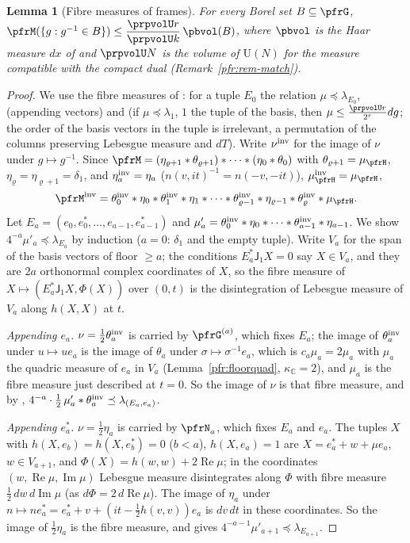 \documentclass[10pt]{amsart}
\newtheorem{lemma}[theorem]{Lemma}
\theoremstyle{definition}
\theoremstyle{remark}
\newcommand{\C}{\mathbb C}
\newcommand{\Rel}{\operatorname{Re}}
\newcommand{\Iml}{\operatorname{Im}}
\providecommand{\auU}{\mathrm U}
\begin{document}
\begin{lemma}[Fibre measures of frames]\label{prp:fibre}
For every Borel set $B\subseteq\pfrG$, $\pfrM(\{g:g^{-1}\in B\})\le\dfrac{\prpvolU r}{\prpvolU k}\,\pbvol(B)$,
where $\pbvol$ is the Haar measure $dx$ of {\cite[\S3.2.1]{P51}} and $\prpvolU N$ is the volume of
$\auU(N)$ for the measure compatible with the compact dual \textup{(}Remark~\ref{pfr:rem-match}\textup{)}.
\end{lemma}
\begin{proof}
We use the fibre measures of {\cite[\S8.4.4]{P51}}: for a tuple $E_0$ the relation $\mu\preceq\lambda_{E_0}$,
{\cite[Lemma~8.81(a)]{P51}} (appending vectors) and {\cite[Lemma~8.80]{P51}} (if $\mu\preceq\lambda_1$, $1$ the tuple of
the basis, then $\mu\le\frac{\prpvolU r}{2^r}dg$; the order of the basis vectors in the tuple is irrelevant, a
permutation of the columns preserving Lebesgue measure and $dT$). Write $\nu^{\rm inv}$ for the image of $\nu$
under $g\mapsto g^{-1}$. Since $\pfrM=(\eta_{\varrho+1}*\theta_{\varrho+1})*\dots*(\eta_0*\theta_0)$ with
$\theta_{\varrho+1}=\mu_\pfrH$, $\eta_\varrho=\eta_{\varrho+1}=\delta_1$, and $\eta_a^{\rm inv}=\eta_a$
($n(v,it)^{-1}=n(-v,-it)$), $\mu_\pfrH^{\rm inv}=\mu_\pfrH$,
\[
\pfrM^{\rm inv}=\theta_0^{\rm inv}*\eta_0*\theta_1^{\rm inv}*\eta_1*\dots*\theta_{\varrho-1}^{\rm inv}*\eta_{\varrho-1}*
\theta_\varrho^{\rm inv}*\mu_\pfrH .
\]
Let $E_a=(e_0,e_0^*,\dots,e_{a-1},e_{a-1}^*)$ and $\mu'_a=\theta_0^{\rm inv}*\eta_0*\dots*\theta_{a-1}^{\rm inv}*\eta_{a-1}$.
We show $4^{-a}\mu'_a\preceq\lambda_{E_a}$ by induction ($a=0$: $\delta_1$ and the empty tuple). Write $V_a$ for the
span of the basis vectors of floor $\ge a$; the conditions $E_a^*\mathsf J_1X=0$ say $X\in V_a$, and they are $2a$
orthonormal complex coordinates of $X$, so the fibre measure of $X\mapsto(E_a^*\mathsf J_1X,\Phi(X))$ over
$(0,t)$ is the disintegration of Lebesgue measure of $V_a$ along $h(X,X)$ at $t$.

\emph{Appending $e_a$.} $\nu=\frac12\theta_a^{\rm inv}$ is carried by $\pfrG^{(a)}$, which fixes $E_a$; the image of
$\theta_a^{\rm inv}$ under $u\mapsto ue_a$ is the image of $\theta_a$ under $\sigma\mapsto\sigma^{-1}e_a$, which is
$c_a\mu_a=2\mu_a$ with $\mu_a$ the quadric measure of $e_a$ in $V_a$ (Lemma~\ref{pfr:floorquad}, $\kappa_\C=2$), and $\mu_a$
is the fibre measure just described at $t=0$. So the image of $\nu$ is that fibre measure, and by
{\cite[Lemma~8.81(a)]{P51}}, $4^{-a}\cdot\frac12\,\mu'_a*\theta_a^{\rm inv}\preceq\lambda_{(E_a,e_a)}$.

\emph{Appending $e_a^*$.} $\nu=\frac12\eta_a$ is carried by $\pfrN_a$, which fixes $E_a$ and $e_a$. The tuples $X$
with $h(X,e_b)=h(X,e_b^*)=0$ ($b<a$), $h(X,e_a)=1$ are $X=e_a^*+w+\mu e_a$, $w\in V_{a+1}$, and
$\Phi(X)=h(w,w)+2\Rel\mu$; in the coordinates $(w,\Rel\mu,\Iml\mu)$ Lebesgue measure disintegrates along $\Phi$ with
fibre measure $\frac12\,dw\,d\Iml\mu$ (as $d\Phi=2\,d\Rel\mu$). The image of $\eta_a$ under $n\mapsto ne_a^*=
e_a^*+v+(it-\frac12h(v,v))e_a$ is $dv\,dt$ in these coordinates. So the image of $\frac12\eta_a$ is the fibre measure,
and {\cite[Lemma~8.81(a)]{P51}} gives $4^{-a-1}\mu'_{a+1}\preceq\lambda_{E_{a+1}}$.


\end{proof}
\end{document}
